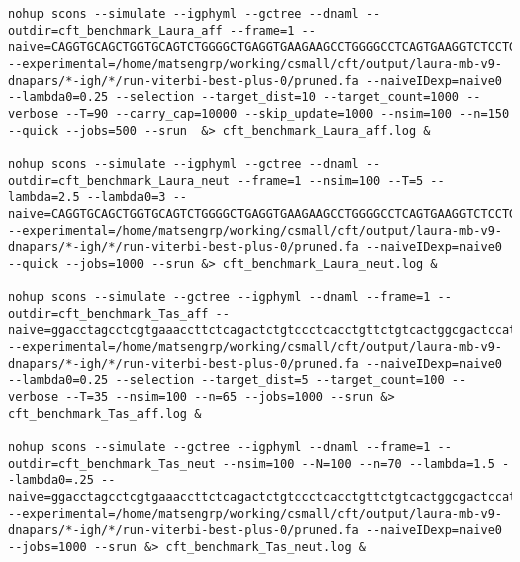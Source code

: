 \begin{lstlisting}
nohup scons --simulate --igphyml --gctree --dnaml --outdir=cft_benchmark_Laura_aff --frame=1 --naive=CAGGTGCAGCTGGTGCAGTCTGGGGCTGAGGTGAAGAAGCCTGGGGCCTCAGTGAAGGTCTCCTGCAAGGCTTCTGGATACACCTTCACCGGCTACTATATGCACTGGGTGCGACAGGCCCCTGGACAAGGGCTTGAGTGGATGGGATGGATCAACCCTAACAGTGGTGGCACAAACTATGCACAGAAGTTTCAGGGCAGGGTCACCATGACCAGGGACACGTCCATCAGCACAGCCTACATGGAGCTGAGCAGGCTGAGATCTGACGACACGGCCGTGTATTACTGTGCGAGAGGGCCATTCCCGAATTACTATGGTACGGGGAGTTATTGGGGGGGTTTTGACTACTGGGGCCAGGGAACCCTGGTCACCGTCTCCTCA --experimental=/home/matsengrp/working/csmall/cft/output/laura-mb-v9-dnapars/*-igh/*/run-viterbi-best-plus-0/pruned.fa --naiveIDexp=naive0 --lambda0=0.25 --selection --target_dist=10 --target_count=1000 --verbose --T=90 --carry_cap=10000 --skip_update=1000 --nsim=100 --n=150 --quick --jobs=500 --srun  &> cft_benchmark_Laura_aff.log &

nohup scons --simulate --igphyml --gctree --dnaml --outdir=cft_benchmark_Laura_neut --frame=1 --nsim=100 --T=5 --lambda=2.5 --lambda0=3 --naive=CAGGTGCAGCTGGTGCAGTCTGGGGCTGAGGTGAAGAAGCCTGGGGCCTCAGTGAAGGTCTCCTGCAAGGCTTCTGGATACACCTTCACCGGCTACTATATGCACTGGGTGCGACAGGCCCCTGGACAAGGGCTTGAGTGGATGGGATGGATCAACCCTAACAGTGGTGGCACAAACTATGCACAGAAGTTTCAGGGCAGGGTCACCATGACCAGGGACACGTCCATCAGCACAGCCTACATGGAGCTGAGCAGGCTGAGATCTGACGACACGGCCGTGTATTACTGTGCGAGAGGGCCATTCCCGAATTACTATGGTACGGGGAGTTATTGGGGGGGTTTTGACTACTGGGGCCAGGGAACCCTGGTCACCGTCTCCTCA --experimental=/home/matsengrp/working/csmall/cft/output/laura-mb-v9-dnapars/*-igh/*/run-viterbi-best-plus-0/pruned.fa --naiveIDexp=naive0 --quick --jobs=1000 --srun &> cft_benchmark_Laura_neut.log &

nohup scons --simulate --gctree --igphyml --dnaml --frame=1 --outdir=cft_benchmark_Tas_aff --naive=ggacctagcctcgtgaaaccttctcagactctgtccctcacctgttctgtcactggcgactccatcaccagtggttactggaactggatccggaaattcccagggaataaacttgagtacatggggtacataagctacagtggtagcacttactacaatccatctctcaaaagtcgaatctccatcactcgagacacatccaagaaccagtactacctgcagttgaattctgtgactactgaggacacagccacatattactgt --experimental=/home/matsengrp/working/csmall/cft/output/laura-mb-v9-dnapars/*-igh/*/run-viterbi-best-plus-0/pruned.fa --naiveIDexp=naive0 --lambda0=0.25 --selection --target_dist=5 --target_count=100 --verbose --T=35 --nsim=100 --n=65 --jobs=1000 --srun &> cft_benchmark_Tas_aff.log &

nohup scons --simulate --gctree --igphyml --dnaml --frame=1 --outdir=cft_benchmark_Tas_neut --nsim=100 --N=100 --n=70 --lambda=1.5 --lambda0=.25 --naive=ggacctagcctcgtgaaaccttctcagactctgtccctcacctgttctgtcactggcgactccatcaccagtggttactggaactggatccggaaattcccagggaataaacttgagtacatggggtacataagctacagtggtagcacttactacaatccatctctcaaaagtcgaatctccatcactcgagacacatccaagaaccagtactacctgcagttgaattctgtgactactgaggacacagccacatattactgt --experimental=/home/matsengrp/working/csmall/cft/output/laura-mb-v9-dnapars/*-igh/*/run-viterbi-best-plus-0/pruned.fa --naiveIDexp=naive0 --jobs=1000 --srun &> cft_benchmark_Tas_neut.log &

\end{lstlisting}





\clearpage
\newpage